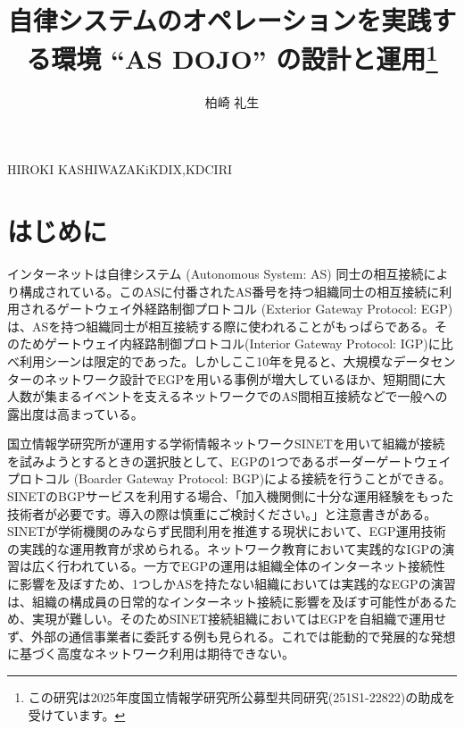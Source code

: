 \documentclass[Japanese]{dicomopapers}
\begin{document}
\title{自律システムのオペレーションを実践する環境 ``AS DOJO'' の設計と運用\footnote{この研究は2025年度国立情報学研究所公募型共同研究(251S1-22822)の助成を受けています。}}



\author{柏崎 礼生}{HIROKI KASHIWAZAKi}{KDIX,KDCIRI}

\maketitle

\section{はじめに}

インターネットは自律システム (Autonomous System: AS) 同士の相互接続により構成されている。このASに付番されたAS番号を持つ組織同士の相互接続に利用されるゲートウェイ外経路制御プロトコル (Exterior Gateway Protocol: EGP) は、ASを持つ組織同士が相互接続する際に使われることがもっぱらである。そのためゲートウェイ内経路制御プロトコル(Interior Gateway Protocol: IGP)に比べ利用シーンは限定的であった。しかしここ10年を見ると、大規模なデータセンターのネットワーク設計でEGPを用いる事例が増大しているほか、短期間に大人数が集まるイベントを支えるネットワークでのAS間相互接続などで一般への露出度は高まっている。

国立情報学研究所が運用する学術情報ネットワークSINETを用いて組織が接続を試みようとするときの選択肢として、EGPの1つであるボーダーゲートウェイプロトコル (Boarder Gateway Protocol: BGP)による接続を行うことができる。SINETのBGPサービスを利用する場合、「加入機関側に十分な運用経験をもった技術者が必要です。導入の際は慎重にご検討ください。」と注意書きがある。SINETが学術機関のみならず民間利用を推進する現状において、EGP運用技術の実践的な運用教育が求められる。ネットワーク教育において実践的なIGPの演習は広く行われている。一方でEGPの運用は組織全体のインターネット接続性に影響を及ぼすため、1つしかASを持たない組織においては実践的なEGPの演習は、組織の構成員の日常的なインターネット接続に影響を及ぼす可能性があるため、実現が難しい。そのためSINET接続組織においてはEGPを自組織で運用せず、外部の通信事業者に委託する例も見られる。これでは能動的で発展的な発想に基づく高度なネットワーク利用は期待できない。
\end{document}
